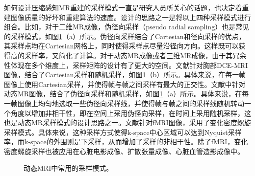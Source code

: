 如何设计压缩感知MR重建的采样模式一直是研究人员所关心的话题，也决定着重建图像质量的好坏和重建算法的速度。设计的思路之一是将以上四种采样模式进行组合。比如，对于二维MR成像，伪径向采样\cite{Sajan2011Accelerated}（pseudo radial sampling）也是常见的采样模式，如图\ref{fig:maskdynamic}（a）所示。伪径向采样结合了Cartesian和径向采样的优点，其采样点均在Cartesian网格上，同时使得采样点尽量沿径向方向。这样既可以获得高的采样率，又简化了计算。对于动态MR成像或者三维MR成像，由于其冗余性体现在多个维度上，采样矩阵的设计有了更大的空间。文献\cite{smith2012}针对胸部DCE-MRI图像，结合了Cartesian采样和随机采样，如图\ref{fig:maskdynamic}（b）所示。具体来说，在每一帧图像上使用Cartesian采样，并使得帧与帧之间采样有最大的正交性。文献\cite{Sajan2011Accelerated}中针对动态MR图像，结合了伪径向采样和随机采样，如图\ref{fig:maskdynamic}（a）所示。具体来说，在每一帧图像上均匀地选取一些伪径向采样线，并使得帧与帧之间的采样线随机转动一个角度以增加非相干性，即在空间上采用伪径向采样，在时间上采用随机采样，这也是动态MR采样模式的设计思路之一。文献\cite{holland2013compressed}针对fMRI图像，采用了变化密度螺旋采样模式。具体来说，这种采样方式使得k-space中心区域可以达到Nyquist采样率，而k-space的外围则是下采样，从而增加了采样的非相干性。除了fMRI，变化密度螺旋采样也被应用在心脏电影成像\cite{kressler2007three}、扩散张量成像\cite{karampinos2009high}、心脏血管造影成像\cite{santos2006single}中。

\begin{figure}[htbp]
\centering
{}
\caption{动态MRI中常用的采样模式。}
\label{fig:maskdynamic}
\end{figure}

